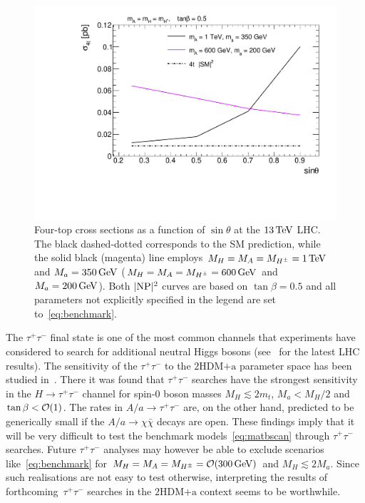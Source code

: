\documentclass[a4paper, 11pt,notoc]{article}
\newcommand{\mA}{\ensuremath{M_{A}}\xspace}
\newcommand{\ma}{\ensuremath{M_{a}}\xspace}
\newcommand{\mH}{\ensuremath{M_{H}}\xspace}
\newcommand{\mHc}{\ensuremath{M_{H^{\pm}}}\xspace}
\newcommand{\hdma}{\ensuremath{\textrm{2HDM+a}}\xspace}
\begin{document}
\begin{figure}[t!]
\centering
\includegraphics[width=.625\textwidth]{plot_st.pdf}
\vspace{1mm}
\caption{\label{DMHF-4top-scan3} Four-top cross sections as a function of $\sin \theta$ at the $13 \, {\rm TeV}$ LHC. The black dashed-dotted corresponds to the SM prediction, while the solid black (magenta) line employs  $\mH =\mA=\mHc = 1 \, {\rm TeV}$ and $\ma = 350  \, {\rm GeV}$ ($\mH =\mA=\mHc = 600 \, {\rm GeV}$ and $\ma = 200 \, {\rm GeV}$). Both $|{\rm NP}|^2$ curves are based on $\tan \beta = 0.5$ and all parameters not explicitly specified in the legend are set to~\eqref{eq:benchmark}. }
\end{figure}

The $\tau^+ \tau^-$ final state is one of the most common channels that experiments have considered to search for additional neutral Higgs bosons (see~\cite{Aaboud:2017sjh,Sirunyan:2018zut} for the latest LHC results).   The sensitivity of the $\tau^+ \tau^-$ to the \hdma parameter space has been studied in~\cite{Bauer:2017ota}. There it was found that  $\tau^+ \tau^-$ searches have the strongest sensitivity in the $H \to \tau^+ \tau^-$ channel for  spin-0 boson  masses $M_H \lesssim 2m_t$, $M_a < M_H/2$ and $\tan \beta  < {\cal O} (1)$.   The rates in  $A/a \to \tau^+ \tau^-$  are, on the other hand, predicted to be generically small if the $A/a \to \chi \bar \chi$ decays are open.  These findings imply that it will be very difficult to test the benchmark models~\eqref{eq:matbscan} through  $\tau^+ \tau^-$ searches. Future  $\tau^+ \tau^-$ analyses may however be able to exclude scenarios like~\eqref{eq:benchmark} for $\mH = \mA = \mHc = {\cal O} (300 \, {\rm GeV})$ and $M_H \lesssim 2M_a$. Since such realisations are not easy to test otherwise, interpreting the results of forthcoming~$\tau^+ \tau^-$ searches in the \hdma context seems to be worthwhile.
\end{document}
